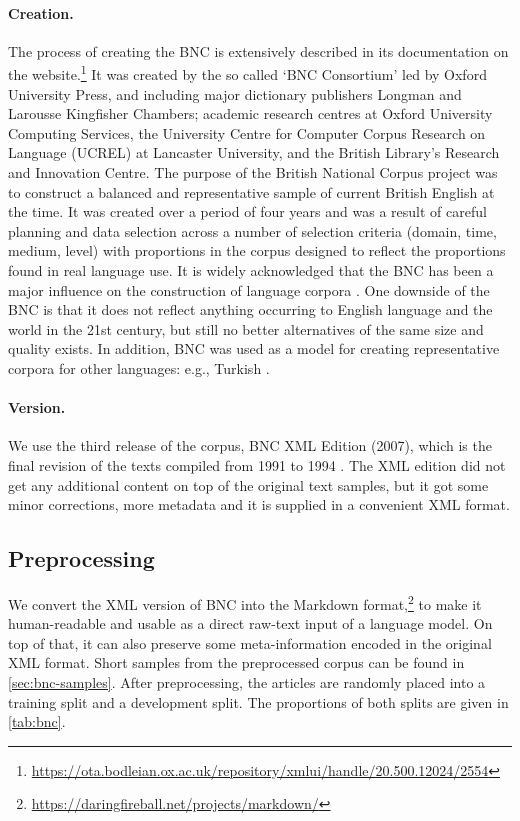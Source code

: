     \paragraph{Creation.} The process of creating the BNC is extensively described in its documentation on the website.\footnote{\url{https://ota.bodleian.ox.ac.uk/repository/xmlui/handle/20.500.12024/2554}} It was created by the so called `BNC Consortium' led by Oxford University Press, and including major dictionary publishers Longman and Larousse Kingfisher Chambers; academic research centres at Oxford University Computing Services, the University Centre for Computer Corpus Research on Language (UCREL) at Lancaster University, and the British Library's Research and Innovation Centre. The purpose of the British National Corpus project was to construct a balanced and representative sample of current British English at the time. It was created over a period of four years and was a result of careful planning and data selection across a number of selection criteria (domain, time, medium, level) with proportions in the corpus designed to reflect the proportions found in real language use. It is widely acknowledged that the BNC has been a major influence on the construction of language corpora \citep{WheredidweGoWrongARetrospectiveLookattheBritishNationalCorpus}. One downside of the BNC is that it does not reflect anything occurring to English language and the world in the 21st century, but still no better alternatives of the same size and quality exists. In addition, BNC was used as a model for creating representative corpora for other languages: e.g., Turkish \citep{aksan-etal-2012-construction}.

    \paragraph{Version.} We use the third release of the corpus, BNC XML Edition (2007), which is the final revision of the texts compiled from 1991 to 1994 \citep{bnc2007british}.
    The XML edition did not get any additional content on top of the original text samples, but it got some minor corrections, more metadata and it is supplied in a convenient XML format.

    \subsection{Preprocessing}
    \label{sec:preprocessing}
    
    We convert the XML version of BNC into the Markdown format,\footnote{\url{https://daringfireball.net/projects/markdown/}} to make it human-readable and usable as a direct raw-text input of a language model. On top of that, it can also preserve some meta-information encoded in the original XML format. Short samples from the preprocessed corpus can be found in \cref{sec:bnc-samples}. After preprocessing, the articles are randomly placed into a training split and a development split. The proportions of both splits are given in \cref{tab:bnc}.
    
